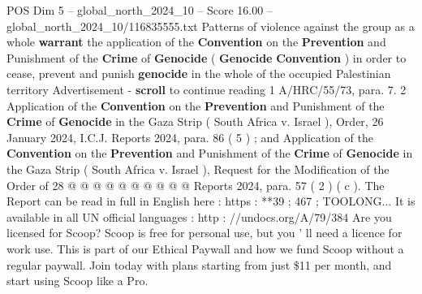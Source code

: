 \begin{textsample}{POS Dim 5 – global\_north\_2024\_10 – Score 16.00 – global\_north\_2024\_10/116835555.txt}
Patterns of violence against the group as a whole \textbf{warrant} the application of the \textbf{Convention} on the \textbf{Prevention} and Punishment of the \textbf{Crime} of \textbf{Genocide} ( \textbf{Genocide} \textbf{Convention} ) in order to cease, prevent and punish \textbf{genocide} in the whole of the occupied Palestinian territory Advertisement - \textbf{scroll} to continue reading 1 A/HRC/55/73, para. 7. 2 Application of the \textbf{Convention} on the \textbf{Prevention} and Punishment of the \textbf{Crime} of \textbf{Genocide} in the Gaza Strip ( South Africa v.
Israel ), Order, 26 January 2024, I.C.J.
Reports 2024, para. 86 ( 5 ) ; and Application of the \textbf{Convention} on the \textbf{Prevention} and Punishment of the \textbf{Crime} of \textbf{Genocide} in the Gaza Strip ( South Africa v.
Israel ), Request for the Modification of the Order of 28 @ @ @ @ @ @ @ @ @ @ Reports 2024, para. 57 ( 2 ) ( c ).
The Report can be read in full in English here : https : **39 ; 467 ; TOOLONG...
It is available in all UN official languages : http : //undocs.org/A/79/384 Are you licensed for Scoop?
Scoop is free for personal use, but you ' ll need a licence for work use.
This is part of our Ethical Paywall and how we fund Scoop without a regular paywall.
Join today with plans starting from just \$11 per month, and start using Scoop like a Pro.

\end{textsample}
